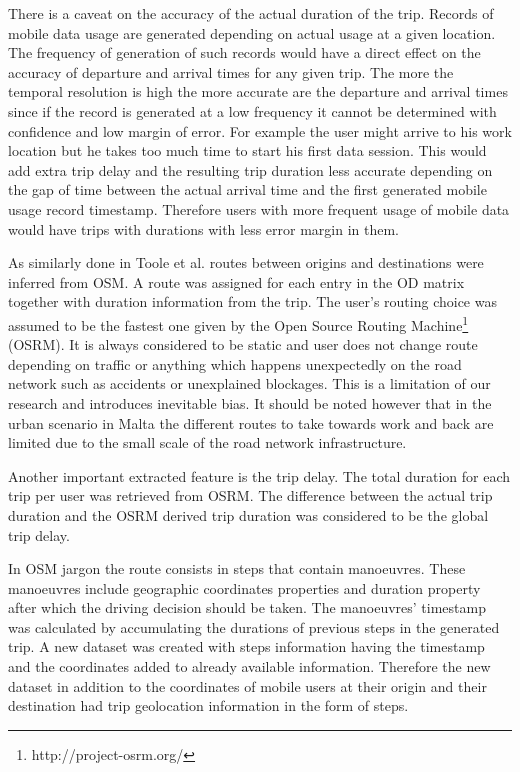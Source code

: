 \documentclass[12pt, a4paper]{report}
\theoremstyle{definition}
\theoremstyle{definition}%
\theoremstyle{definition}%
\theoremstyle{definition}%
\theoremstyle{definition}%
\theoremstyle{definition}%
\begin{document}

There is a caveat on the accuracy of the actual duration of the trip. Records of mobile data usage are generated depending on actual usage at a given location. The frequency of generation of such records would have a direct effect on the accuracy of departure and arrival times for any given trip. The more the temporal resolution is high the more accurate are the departure and arrival times since if the record is generated at a low frequency it cannot be determined with confidence and low margin of error. For example the user might arrive to his work location but he takes too much time to start his first data session. This would add extra trip delay and the resulting trip duration less accurate depending on the gap of time between the actual arrival time and the first generated mobile usage record timestamp. Therefore users with more frequent usage of mobile data would have trips with durations with less error margin in them.   


As similarly done in Toole et al. \cite{Toole2015} routes between origins and destinations were inferred from OSM. A route was assigned for each entry in the OD matrix together with duration information from the trip. The user's routing choice was assumed to be the fastest one given by the Open Source Routing Machine\footnote{http://project-osrm.org/} (OSRM). It is always considered to be static and user does not change route depending on traffic or anything which happens unexpectedly on the road network such as accidents or unexplained blockages. This is a limitation of our research and introduces inevitable bias. It should be noted however that in the urban scenario in Malta the different routes to take towards work and back are limited due to the small scale of the road network infrastructure. 

Another important extracted feature is the trip delay. The total duration for each trip per user was retrieved from OSRM. The difference between the actual trip duration and the OSRM derived trip duration was considered to be the global trip delay.

In OSM jargon the route consists in steps that contain manoeuvres. These manoeuvres include geographic coordinates properties and duration property after which the driving decision should be taken. The manoeuvres' timestamp was calculated by accumulating the durations of previous steps in the generated trip. A new dataset was created with steps information having the timestamp and the coordinates added to already available information. Therefore the new dataset in addition to the coordinates of mobile users at their origin and their destination had trip geolocation information in the form of steps.
 
\end{document}
